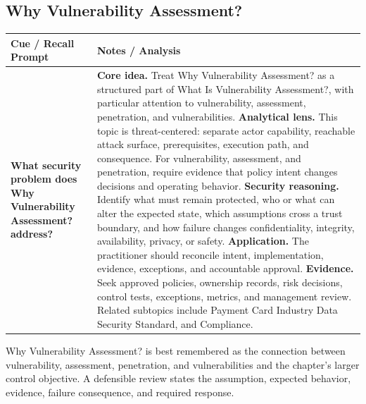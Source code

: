 \documentclass[11pt]{article}
\newcommand{\CornellHeader}{%
\rowcolor{Navy}\color{white}\bfseries Cue / Recall Prompt & \color{white}\bfseries Notes / Analysis\\\hline}
\newcommand{\CornellRow}[2]{%
\cellcolor{CueGray}\RaggedRight\textbf{#1} & \RaggedRight #2\\\hline}
\begin{document}
\subsection*{Why Vulnerability Assessment?}
\begin{longtable}{>{\RaggedRight\arraybackslash}p{}|>{\RaggedRight\arraybackslash}p{}}
\CornellHeader
\CornellRow{What security problem does Why Vulnerability Assessment? address?}{\textbf{Core idea.} Treat Why Vulnerability Assessment? as a structured part of What Is Vulnerability Assessment?, with particular attention to vulnerability, assessment, penetration, and vulnerabilities. \textbf{Analytical lens.} This topic is threat-centered: separate actor capability, reachable attack surface, prerequisites, execution path, and consequence. For vulnerability, assessment, and penetration, require evidence that policy intent changes decisions and operating behavior. \textbf{Security reasoning.} Identify what must remain protected, who or what can alter the expected state, which assumptions cross a trust boundary, and how failure changes confidentiality, integrity, availability, privacy, or safety. \textbf{Application.} The practitioner should reconcile intent, implementation, evidence, exceptions, and accountable approval. \textbf{Evidence.} Seek approved policies, ownership records, risk decisions, control tests, exceptions, metrics, and management review. Related subtopics include Payment Card Industry Data Security Standard, and Compliance.}
\end{longtable}
\begin{topicsummary}
Why Vulnerability Assessment? is best remembered as the connection between vulnerability, assessment, penetration, and vulnerabilities and the chapter's larger control objective. A defensible review states the assumption, expected behavior, evidence, failure consequence, and required response.
\end{topicsummary}
\end{document}
